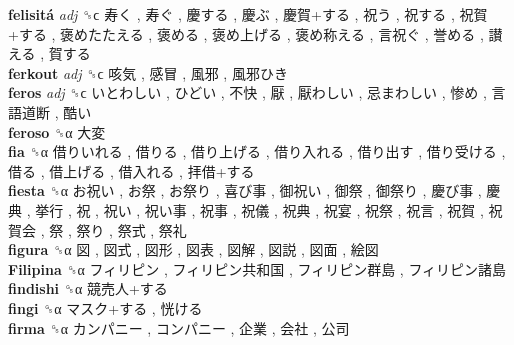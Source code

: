 \textbf{felisitá} \emph{adj}  ␝ϲ   寿く ,  寿ぐ ,  慶する ,  慶ぶ ,  慶賀+する ,  祝う ,  祝する ,  祝賀+する ,  褒めたたえる ,  褒める ,  褒め上げる ,  褒め称える ,  言祝ぐ ,  誉める ,  讃える ,  賀する   \\
\textbf{ferkout} \emph{adj}  ␝ϲ   咳気 ,  感冒 ,  風邪 ,  風邪ひき   \\
\textbf{feros} \emph{adj}  ␝ϲ   いとわしい ,  ひどい ,  不快 ,  厭 ,  厭わしい ,  忌まわしい ,  惨め ,  言語道断 ,  酷い   \\
\textbf{feroso} ␝α   大変   \\
\textbf{fia} ␝α   借りいれる ,  借りる ,  借り上げる ,  借り入れる ,  借り出す ,  借り受ける ,  借る ,  借上げる ,  借入れる ,  拝借+する   \\
\textbf{fiesta} ␝α   お祝い ,  お祭 ,  お祭り ,  喜び事 ,  御祝い ,  御祭 ,  御祭り ,  慶び事 ,  慶典 ,  挙行 ,  祝 ,  祝い ,  祝い事 ,  祝事 ,  祝儀 ,  祝典 ,  祝宴 ,  祝祭 ,  祝言 ,  祝賀 ,  祝賀会 ,  祭 ,  祭り ,  祭式 ,  祭礼   \\
\textbf{figura} ␝α   図 ,  図式 ,  図形 ,  図表 ,  図解 ,  図説 ,  図面 ,  絵図   \\
\textbf{Filipina} ␝α   フィリピン ,  フィリピン共和国 ,  フィリピン群島 ,  フィリピン諸島   \\
\textbf{findishi} ␝α   競売人+する   \\
\textbf{fingi} ␝α   マスク+する ,  恍ける   \\
\textbf{firma} ␝α   カンパニー ,  コンパニー ,  企業 ,  会社 ,  公司   \\
